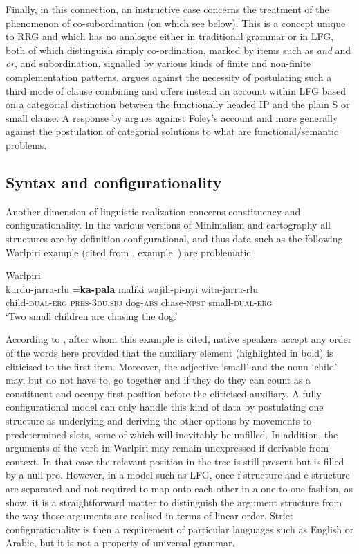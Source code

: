 \documentclass[output=paper,hidelinks]{langscibook}
\begin{document}
Finally, in this connection, an instructive case concerns the treatment of the phenomenon of co-subordination (on which see  below). This is a concept unique to RRG and which has no analogue either in traditional grammar or in LFG, both of which distinguish simply co-ordination, marked by items such as \textit{and} and \textit{or}, and subordination, signalled by various kinds of finite and non-finite complementation patterns. \citet{Foley2010} argues against the necessity of postulating such a third mode of clause combining and offers instead an account within LFG based on a categorial distinction between the functionally headed IP and the plain S or small clause. A response by \citet{VanValin2021} argues against Foley's account and more generally against the postulation of categorial solutions to what are functional/semantic problems.

\subsection{Syntax and configurationality}
\label{sec:RRG:3.4}

Another dimension of linguistic realization concerns constituency and configurationality. In the various versions of Minimalism and cartography all structures are by definition configurational, and thus data such as the following Warlpiri example (cited from \citealt{AustBres96}, example~) are problematic.

\ea%
   \label{ex:RRG:33}Warlpiri\\
   \gll kurdu-jarra-rlu  =\textbf{ka-pala}    maliki   wajili-pi-nyi wita-jarra-rlu\\
      child-\textsc{dual-erg}  \textsc{pres-3du.sbj}  dog-\textsc{abs}   chase-\textsc{npst} small-\textsc{dual-erg}\\
   \glt `Two small children are chasing the dog.'
   \z

\noindent According to \citet{Hale83}, after whom this example is cited, native speakers accept any order of the words here provided that the auxiliary element (highlighted in bold) is cliticised to the first item. Moreover, the adjective `small' and the noun `child' may, but do not have to, go together and if they do they can count as a constituent and occupy first position before the cliticised auxiliary. A fully configurational model can only handle this kind of data by postulating one structure as underlying and deriving the other options by movements to predetermined slots, some of which will inevitably be unfilled. In addition, the arguments of the verb in Warlpiri may remain unexpressed if derivable from context. In that case the relevant position in the tree is still present but is filled by a null pro. However, in a model such as LFG, once f-structure and c-structure are separated and not required to map onto each other in a one-to-one fashion, as \citet{AustBres96} show, it is a straightforward matter to distinguish the argument structure from the way those arguments are realised in terms of linear order. Strict configurationality is then a requirement of particular languages such as English or Arabic, but it is not a property of universal grammar.
\end{document}
